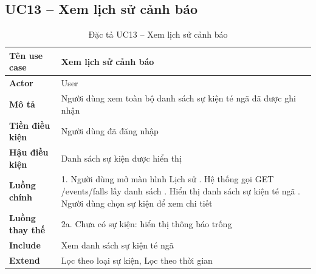 \subsection*{UC13 -- Xem lịch sử cảnh báo}
\begin{table}[H]
    \captionsetup{justification=raggedright, singlelinecheck=false}
    \caption{Đặc tả UC13 -- Xem lịch sử cảnh báo}
\centering
\begin{tabular}{|p{3.5cm}|p{10cm}|}
\hline
\textbf{Tên use case} & Xem lịch sử cảnh báo \\
\hline
\textbf{Actor} & User \\
\hline
\textbf{Mô tả} & Người dùng xem toàn bộ danh sách sự kiện
  té ngã đã được ghi nhận \\
\hline
\textbf{Tiền điều kiện} & Người dùng đã đăng nhập \\
\hline
\textbf{Hậu điều kiện} & Danh sách sự kiện được hiển thị \\
\hline
\textbf{Luồng chính} &
  1. Người dùng mở màn hình Lịch sử \newline
  2. Hệ thống gọi GET /events/falls lấy danh sách \newline
  3. Hiển thị danh sách sự kiện té ngã \newline
  4. Người dùng chọn sự kiện để xem chi tiết \\
\hline
\textbf{Luồng thay thế} &
  2a. Chưa có sự kiện: hiển thị thông báo trống \\
\hline
\textbf{Include} & Xem danh sách sự kiện té ngã \\
\hline
\textbf{Extend} & Lọc theo loại sự kiện, Lọc theo thời gian \\
\hline
\end{tabular}

\end{table}

